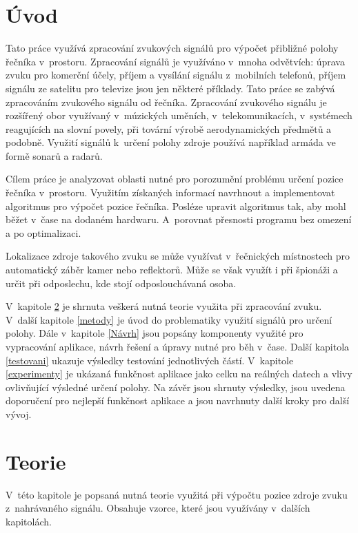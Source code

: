 
\chapter{Úvod}

Tato práce využívá zpracování zvukových signálů pro výpočet přibližné polohy řečníka v~prostoru. Zpracování signálů je využíváno v~mnoha odvětvích: úprava zvuku pro komerční účely, příjem a vysílání signálu z~mobilních telefonů, příjem signálu ze satelitu pro televize jsou jen některé příklady. Tato práce se zabývá zpracováním zvukového signálu od řečníka. Zpracování zvukového signálu je rozšířený obor využívaný v~múzických uměních, v~telekomunikacích, v~systémech reagujících na slovní povely, při tovární výrobě aerodynamických předmětů a podobně. Využití signálů k~určení polohy zdroje používá například armáda ve formě sonarů a radarů.

Cílem práce je analyzovat oblasti nutné pro porozumění problému určení pozice řečníka v~prostoru. Využitím získaných informací navrhnout a implementovat algoritmus pro výpočet pozice řečníka. Posléze upravit algoritmus tak, aby mohl běžet v~čase na dodaném hardwaru. A~porovnat přesnosti programu bez omezení a po optimalizaci.

Lokalizace zdroje takového zvuku se může využívat v~řečnických místnostech pro automatický záběr kamer nebo reflektorů. Může se však využít i při špionáži a určit při odposlechu, kde stojí odposlouchávaná osoba.

V~kapitole \ref{Teorie} je shrnuta veškerá nutná teorie využita při zpracování zvuku. V~další kapitole \ref{metody} je úvod do problematiky využití signálů pro určení polohy. Dále v~kapitole \ref{Návrh} jsou popsány komponenty využité pro vypracování aplikace, návrh řešení a úpravy nutné pro běh v~čase. Další kapitola \ref{testovani} ukazuje výsledky testování jednotlivých částí. V~kapitole \ref{experimenty} je ukázaná funkčnost aplikace jako celku na reálných datech a vlivy ovlivňující výsledné určení polohy. Na závěr jsou shrnuty výsledky, jsou uvedena doporučení pro nejlepší funkčnost aplikace a jsou navrhnuty další kroky pro další vývoj.

\chapter{Teorie} 
\label{Teorie}

V~této kapitole je popsaná nutná teorie využitá při výpočtu pozice zdroje zvuku z~nahrávaného signálu. Obsahuje vzorce, které jsou využívány v~dalších kapitolách.

